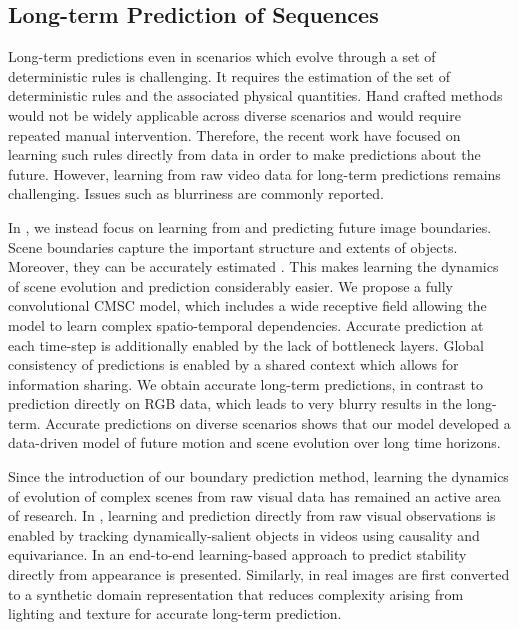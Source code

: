 \subsection{Long-term Prediction of Sequences} 
Long-term predictions even in scenarios which evolve through a set of deterministic rules is challenging.  It requires the estimation of the set of deterministic rules and the associated physical quantities. Hand crafted methods would not be widely applicable across diverse scenarios and would require repeated manual intervention. Therefore, the recent work \cite{fragkiadaki2015learning,lerer2016learning,li2016fall,battaglia2016interaction,watters2017visual} have focused on learning such rules directly from data in order to make predictions about the future. However, learning from raw video data for long-term predictions remains challenging. Issues such as blurriness are commonly reported. 

 In \cite{BhattacharyyaMS18}, we instead focus on learning from and predicting future image boundaries. Scene boundaries capture the important structure and extents of objects. Moreover, they can be accurately estimated \cite{khoreva2016improved}. This makes learning the dynamics of scene evolution and prediction considerably easier. We propose a fully convolutional CMSC model, which includes a wide receptive field allowing the model to learn complex spatio-temporal dependencies.  Accurate prediction at each time-step is additionally enabled by the lack of bottleneck layers.  Global consistency of predictions is enabled by a shared context which allows for information sharing. We obtain accurate long-term predictions, in contrast to prediction directly on RGB data, which leads to very blurry results in the long-term. Accurate predictions on diverse scenarios shows that our model developed a data-driven model of future motion and scene evolution over long time horizons.

Since the introduction of our boundary prediction method, learning the dynamics of evolution of complex scenes from raw visual data has remained an active area of research. 
In \cite{EhrhardtMMV18}, learning and prediction directly from raw visual observations is enabled by tracking dynamically-salient objects in videos using causality and equivariance. 
In \cite{abs-1904-09860} an end-to-end learning-based approach to predict stability directly from appearance is presented. 
Similarly, in \cite{abs-1809-03330} real images are first converted to a synthetic domain representation that reduces complexity arising from lighting and texture for accurate long-term prediction.

